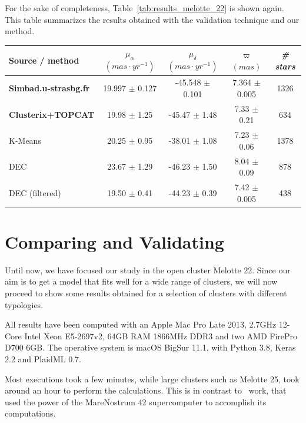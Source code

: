 \documentclass[11pt, a4paper, english]{book}
\begin{document}
For the sake of completeness, Table~\ref{tab:results_melotte_22} is shown again.
This table summarizes the results obtained with the validation technique and our method.

\begin{table}[h!]
  \begin{center}
    \begin{tabular}{l|c|c|c|c}
      \textbf{Source / method} & \emph{\(\mu_{\alpha}\) \((mas \cdot yr^{-1})\)} & \emph{\(\mu_{\delta}\) \((mas \cdot yr^{-1})\)}
      & \emph{\( \varpi \) \((mas)\)} & \emph{\# stars} \\
      \hline
      \textbf{Simbad.u-strasbg.fr} & 19.997 \( \pm \) 0.127 & -45.548 \( \pm \) 0.101 & 7.364 \( \pm \) 0.005 & 1326 \\
      \textbf{Clusterix+TOPCAT} & 19.98 \( \pm \) 1.25 & -45.47 \( \pm \) 1.48 & 7.33 \( \pm \) 0.21 & 634 \\
      K-Means & 20.25 \( \pm \) 0.95 & -38.01 \( \pm \) 1.08 & 7.23 \( \pm \) 0.06 & 1378 \\
      DEC & 23.67 \( \pm \) 1.29 & -46.23 \( \pm \) 1.50 & 8.04 \( \pm \) 0.09 & 878 \\
      DEC (filtered) & 19.50 \( \pm \) 0.41 & -44.23 \( \pm \) 0.39 & 7.42 \( \pm \) 0.005 & 438 \\
    \end{tabular}
  \end{center}
\end{table}

\section{Comparing and Validating}
\label{sec:comparing_and_validating}

Until now, we have focused our study in the open cluster Melotte 22.
Since our aim is to get a model that fits well for a wide range of clusters,
we will now proceed to show some results obtained for a selection of clusters with different typologies.

All results have been computed with an Apple Mac Pro Late 2013,
2.7GHz 12-Core Intel Xeon E5-2697v2, 64GB RAM 1866MHz DDR3 and two AMD FirePro D700 6GB.
The operative system is macOS BigSur 11.1, with Python 3.8, Keras 2.2 and PlaidML 0.7.

Most executions took a few minutes, while large clusters such as Melotte 25,
took around an hour to perform the calculations.
This is in contrast to~ work,
that used the power of the MareNostrum 42 supercomputer to accomplish its computations.
\end{document}
